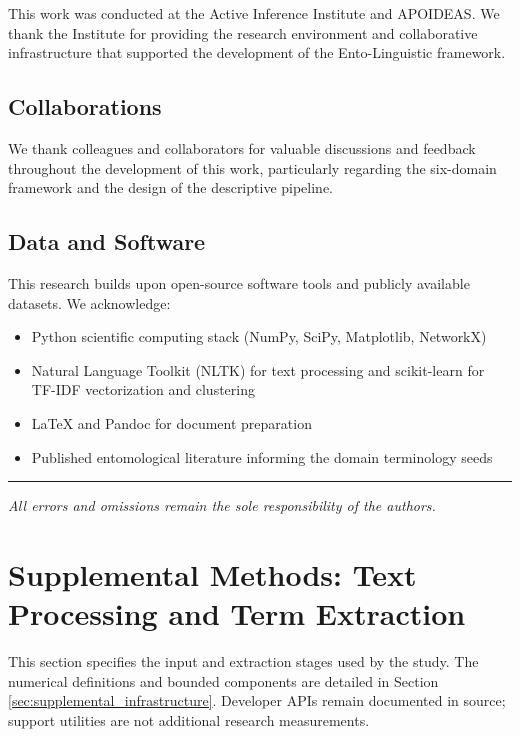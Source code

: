 \documentclass[
]{article}
\providecommand{\tightlist}{%
  \setlength{\itemsep}{0pt}\setlength{\parskip}{0pt}}
\numberwithin{equation}{section}
\begin{document}
This work was conducted at the Active Inference Institute and APOIDEAS.
We thank the Institute for providing the research environment and
collaborative infrastructure that supported the development of the
Ento-Linguistic framework.

\subsection{Collaborations}\label{collaborations}

We thank colleagues and collaborators for valuable discussions and
feedback throughout the development of this work, particularly regarding
the six-domain framework and the design of the descriptive pipeline.

\subsection{Data and Software}\label{data-and-software}

This research builds upon open-source software tools and publicly
available datasets. We acknowledge:

\begin{itemize}
\tightlist
\item
  Python scientific computing stack (NumPy, SciPy, Matplotlib, NetworkX)
\item
  Natural Language Toolkit (NLTK) for text processing and scikit-learn
  for TF-IDF vectorization and clustering
\item
  LaTeX and Pandoc for document preparation
\item
  Published entomological literature informing the domain terminology
  seeds
\end{itemize}

\begin{center}\rule{0.5\linewidth}{0.5pt}\end{center}

\emph{All errors and omissions remain the sole responsibility of the
authors.}

\clearpage

\section{Supplemental Methods: Text Processing and Term
Extraction}\label{sec:supplemental_methods}

This section specifies the input and extraction stages used by the
study. The numerical definitions and bounded components are detailed in
Section \ref{sec:supplemental_infrastructure}. Developer APIs remain
documented in source; support utilities are not additional research
measurements.
\end{document}
